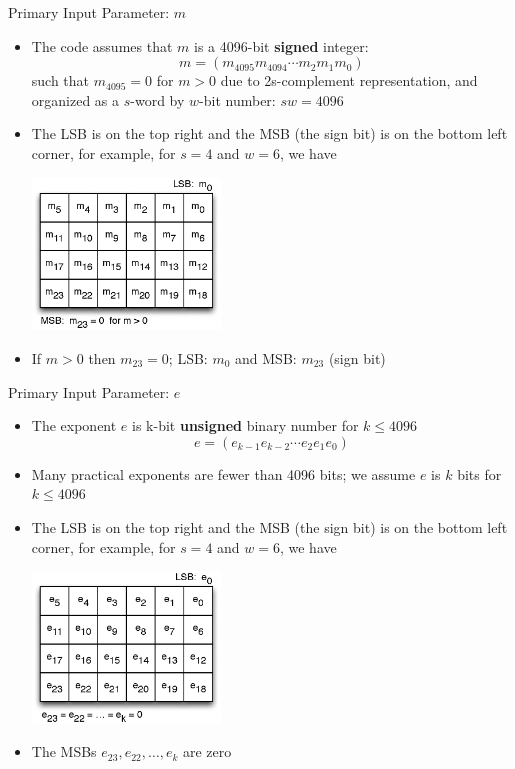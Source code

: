 \documentclass[xcolor=dvipsnames]{beamer}
\begin{document}
\begin{frame}{Primary Input Parameter: $m$}
\begin{itemize}

\item The code assumes that $m$ is a 4096-bit \textbf{signed} integer:
\[
m=(m_{4095}m_{4094}\cdots m_2m_1m_0)
\]
such that $m_{4095}=0$ for $m>0$ due to 2s-complement representation,
and organized as a $s$-word by $w$-bit number: $sw=4096$
\item The LSB is on the top right and
the MSB (the sign bit) is on the bottom left corner, for example,
for $s=4$ and $w=6$, we have

\centerline{\includegraphics[width=5cm]{m24.eps}}

\item If $m>0$ then $m_{23}=0$; LSB: $m_0$ and MSB: $m_{23}$ (sign bit)

\end{itemize}
\end{frame}

\begin{frame}{Primary Input Parameter: $e$}
\begin{itemize}

\item The exponent $e$ is k-bit \textbf{unsigned} binary number for $k \leq 4096$
\[
e=(e_{k-1}e_{k-2}\cdots e_2e_1e_0)
\]

\item Many practical exponents are fewer than 4096 bits;
we assume $e$ is $k$ bits for $k\leq 4096$

\item The LSB is on the top right and
the MSB (the sign bit) is on the bottom left corner, for example,
for $s=4$ and $w=6$, we have

\centerline{\includegraphics[width=5cm]{e24.eps}}

\item The MSBs $e_{23},e_{22},\ldots,e_k$ are zero

\end{itemize}
\end{frame}
\end{document}
